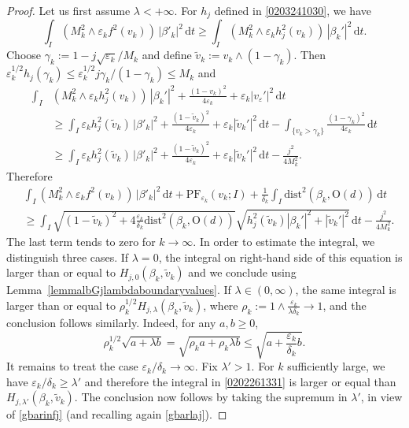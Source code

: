 \documentclass[a4paper,reqno]{amsart}
\newcommand\tv{\widetilde{v}}
\newcommand\dist{{\mathrm{dist}}}
\newcommand\eps{{\varepsilon}}
\newcommand\dt{{\,\mathrm{d}t}}
\theoremstyle{remark}
\def\e{\varepsilon}
\newcommand{\EEE}{\color{black}}
\newcommand{\On}{\mathrm{O}(d)}
\newcommand\AT{\text{PF}}
\numberwithin{equation}{section}
\begin{document}
\begin{proof}
Let us first assume $\lambda < +\infty$. For $h_j$ defined in \eqref{0203241030}, we have 
	\begin{equation}\label{f:estlb1d1}
		\int_{{I} }  ( M^2_k\wedge {\e_k}f^2(v_k) )\,|\beta'_k|^2 \dt
		\geq \int_{I} 
		( M^2_k \wedge  \e_k h_j^2(v_k))\,| \beta_k'|^2 \dt.
	\end{equation}
Choose $\gamma_k:=1-j \sqrt{\eps_k}/M_k$
and define $\widetilde v_k:=v_k\wedge (1-\gamma_k)$.
Then
$\eps_k^{1/2} h_j(\gamma_k)
\le \eps_k^{1/2} j\gamma_k /(1-\gamma_k)\le
M_k$ and
\begin{equation}\label{f:estlb1d2}
		\begin{split}
			\int_{I} &
			(M^2_k  \wedge \e_k h_j^2(v_k))\,| \beta_k'|^2 + \frac{(1-v_k)^2}{4\e_k}+\e_k | v_\varepsilon'|^2 \dt
			\\
			& \geq \int_{I}  \e_k h_j^2(\tv_k)
			\,| \beta'_k|^2 + \frac{(1-\tv_k)^2}{4\e_k} + \e_k | \tv_k'|^2  \dt
			- \int_{\{v_k >\gamma_k\}} 	\frac{(1-\gamma_k)^2}{4\e_k} \dt
			\\
			& \geq \int_{I}  \e_k h_j^2(\tv_k)
			\,| \beta'_k|^2 + \frac{(1-\tv_k)^2}{4\e_k} + \e_k | \tv_k'|^2  \dt
			- \frac{j^2}{4M_k^2} .
		\end{split}
	\end{equation}
Therefore
\begin{equation}\begin{split}\label{0202261331}
 &	\int_{{I} } ( M^2_k\wedge {\e_k}f^2(v_k) )\,|\beta'_k|^2 \dt + \AT_{\e_k}(v_k;I) +
\frac{1}{\delta_k} \int_{{I} }\dist^2(\beta_k, \On)  \dt \\
&\ge
\int_I
 \sqrt{ (1-\tv_k)^2
 + 4 \frac{\eps_k}{\delta_k} \dist^2(\beta_k, \On)}
 \sqrt{h_j^2(\tv_k)|\beta_k'|^2 + |\tv_k'|^2} \dt
-\frac{j^2}{4M_k^2}.
 \end{split}\end{equation}
The last term tends to zero for $k\to\infty$. In order to estimate the integral, we distinguish three cases.
 If $\lambda=0$,
the integral on right-hand side of this equation is larger than or equal to $H_{j,0}(\beta_k,\tv_k)$ and we conclude using Lemma~\ref{lemmalbGjlambdaboundaryvalues}.
If $\lambda\in(0,\infty)$, the same integral is larger than or equal to
$\rho_k^{1/2}H_{j,\lambda}(\beta_k,\tv_k)$, where
$\rho_k:=1\wedge {\frac{\eps_k}{\lambda\delta_k}}\to1$,
and the conclusion follows similarly.
Indeed, for any $a,b\ge0$,
\begin{equation*}
 \rho_k^{1/2}\sqrt{a+\lambda b}
 =\sqrt{\rho_k a + \rho_k\lambda b}
 \le \sqrt{ a + \frac{\eps_k}{\delta_k} b}.
\end{equation*}
It remains to treat the case $\eps_k/\delta_k\to\infty$. Fix $\lambda'>1$.
For $k$ sufficiently large, we have
$\eps_k/\delta_k\ge\lambda'$ and therefore
the integral in \eqref{0202261331} is larger or equal than $H_{j,\lambda'}(\beta_k, \tv_k)$.
The conclusion now follows by taking the supremum in $\lambda'$, in view of \eqref{gbarinfj} (and recalling again \eqref{gbarlaj}).
\end{proof}
\end{document}
